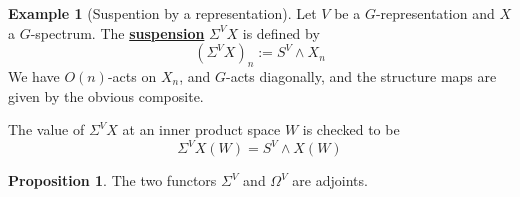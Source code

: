 \documentclass{article}
\theoremstyle{definition}
\newtheorem{proposition}[theorem]{Proposition}
\newtheorem{example}[theorem]{Example}
\begin{document}
\begin{tcolorbox}[colback=yellow!5!white,colframe=yellow!30!white]
\begin{example}[Suspention by a representation]
    Let $V$ be a $G$-representation and $X$ a $G$-spectrum. The \underline{\textbf{suspension}} $\Sigma^VX$ is defined by 
    \[(\Sigma^VX)_n:=S^V\wedge X_n\]
    We have $O(n)$-acts on $X_n$, and $G$-acts diagonally, and the structure maps are given by the obvious composite.

The value of $\Sigma^VX$ at an inner product space $W$ is checked to be 
\[\Sigma^VX(W)=S^V\wedge X(W)\]

\end{example}
\end{tcolorbox}


\begin{tcolorbox}[colback=blue!5!white,colframe=blue!30!white]
\begin{proposition}
The two functors $\Sigma^V$ and $\Omega^V$ are adjoints.
\end{proposition}
\end{tcolorbox}
\end{document}
